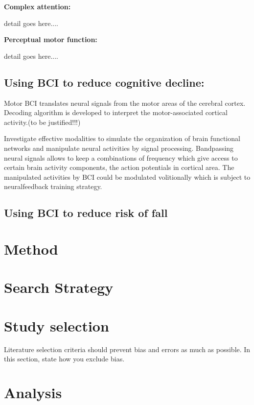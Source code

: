 \documentclass[conference,compsoc]{IEEEtran}
\begin{document}
\begin{comment}
Neural Mechanisms for Memory Control in the Prefrontal Cortex in \cite{Funahashi_2017}.
\end{comment}

\textbf{Complex attention:}

detail goes here....

\textbf{Perceptual motor function:}

detail goes here....

\subsection{Using BCI to reduce cognitive decline:}

Motor BCI translates neural signals from the motor areas of the cerebral cortex. Decoding algorithm is developed to interpret the motor-associated cortical activity.(to be justified!!!)

Investigate effective modalities to simulate the organization 
of brain functional networks and manipulate neural activities by signal processing. Bandpassing neural signals allows to keep a combinations of frequency which give access to certain brain activity components, the action potentials in cortical area. The manipulated activities by BCI 
could be modulated volitionally which is subject to neuralfeedback training strategy.

\subsection{Using BCI to reduce risk of fall}

\section{Method}
\section{Search Strategy}
\section{Study selection}
Literature selection criteria should prevent bias and errors as much as possible. In this section, state how you exclude bias.
\section{Analysis}
\end{document}
